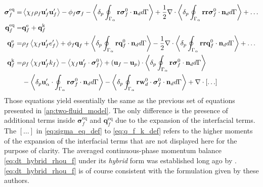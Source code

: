 \begin{align}
    \label{eq:sigma_eq_def}
    \bm{\sigma}_f^\text{eq}
    =& 
    \avg{\chi_f\rho_f\textbf{u}_f'\textbf{u}_f'}
    - \phi_f \bm{\sigma}_f%
    - \pSavg{{\textbf{r}\bm{\sigma}_f^0 \cdot \textbf{n}_d}}
    +\frac{1}{2}\div \pSavg{{\textbf{rr}\bm{\sigma}_f^0 \cdot \textbf{n}_d}}
    + \ldots
    \\
    \textbf{q}_f^\text{eq}
    =&\textbf{q}_f^\text{e} +\textbf{q}_f^\text{k} \nonumber \\
    \textbf{q}_f^\text{e}
    =& \rho_f \avg{\chi_f \textbf{u}_f' e_f'} 
    + \phi_f\textbf{q}_f 
    +\pSavg{{\textbf{r}\textbf{q}_f^0 \cdot \textbf{n}_d}} 
    -\frac{1}{2}\div \pSavg{{\textbf{rr}\textbf{q}_f^0 \cdot \textbf{n}_d}} 
    + \ldots
    \\
    \textbf{q}_f^\text{k}
    =& \rho_f \avg{\chi_f \textbf{u}_f' k_f} 
    - \avg{\chi_f \textbf{u}_f' \cdot \bm{\sigma}_f^0}
    + (\textbf{u}_f - \textbf{u}_p)\cdot
    \pSavg{{\textbf{r}\bm{\sigma}_f^0 \cdot \textbf{n}_d}}
    \label{eq:q_f_k_def}
    \\\nonumber &
    - \pavg{ \textbf{u}_\alpha' \cdot \intS{ \textbf{r} \bm{\sigma}_f^0 \cdot \textbf{n}_d}}
    - \pavg{ \intS{\textbf{r}\textbf{w}_d^0 \cdot \bm{\sigma}_f^0 \cdot \textbf{n}_d}}
    + \div[\ldots]
\end{align}
Those equations yield essentially the same as the previous set of equations presented in \ref{ap:two-fluid_model}.
The only difference is the presence of additional terms inside $\bm{\sigma}^\text{eq}_f$ and $\textbf{q}^\text{eq}_f$ due to the expansion of the interfacial terms. 
The $[\ldots]$ in \ref{eq:sigma_eq_def} to \ref{eq:q_f_k_def} refers to the higher moments of the expansion of the interfacial terms that are not displayed here for the purpose of clarity. 
The averaged continuous-phase momentum balance \eqref{eq:dt_hybrid_rhou_f} under its \textit{hybrid} form was established long ago by \citet{zhang1997momentum,jackson1997locally}.  
\ref{eq:dt_hybrid_rhou_f} is of course consistent with the formulation given by these authors.

